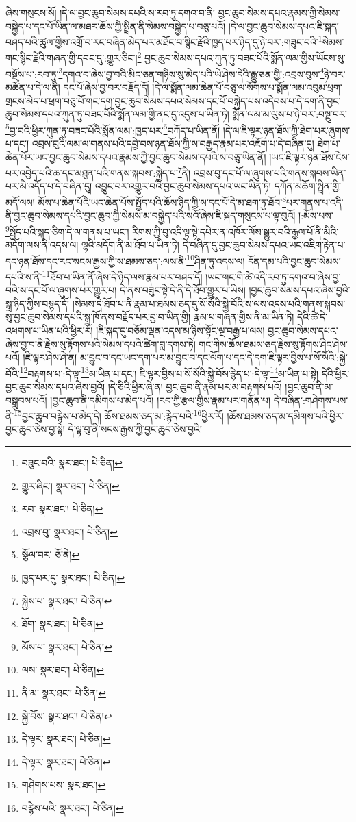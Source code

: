 ཞེས་གསུངས་སོ། །དེ་ལ་བྱང་ཆུབ་སེམས་དཔའི་ས་རབ་ཏུ་དགའ་བ་ནི། བྱང་ཆུབ་སེམས་དཔའ་རྣམས་ཀྱི་སེམས་བསྐྱེད་པ་དང་པོ་ཡིན་ལ་མཐར་ཆོས་ཀྱི་སྤྲིན་ནི་སེམས་བསྐྱེད་པ་བཅུ་པའོ། །དེ་ལ་བྱང་ཆུབ་སེམས་དཔའ་ཇི་སྐད་བཤད་པའི་ཚུལ་གྱིས་འགྲོ་བ་རང་བཞིན་མེད་པར་མཐོང་བ་སྙིང་རྗེའི་ཁྱད་པར་ཉིད་དུ་ཉེ་བར་:གཟུང་བའི་\footnote{བཟུང་བའི་  སྣར་ཐང་།  པེ་ཅིན། }སེམས་གང་སྙིང་རྗེའི་གཞན་གྱི་དབང་དུ་:གྱུར་ཅིང་།\footnote{གྱུར་ཞིང་།  སྣར་ཐང་།  པེ་ཅིན། } བྱང་ཆུབ་སེམས་དཔའ་ཀུན་ཏུ་བཟང་པོའི་སྨོན་ལམ་གྱིས་ཡོངས་སུ་བསྔོས་པ་:རབ་ཏུ་\footnote{རབ་  སྣར་ཐང་།  པེ་ཅིན། }དགའ་བ་ཞེས་བྱ་བའི་མིང་ཅན་གཉིས་སུ་མེད་པའི་ཡེ་ཤེས་དེའི་རྒྱུ་ཅན་གྱི་:འབྲས་བུས་\footnote{འབྲས་བུ་  སྣར་ཐང་།  པེ་ཅིན། }ཉེ་བར་མཚོན་པ་དེ་ལ་ནི། དང་པོ་ཞེས་བྱ་བར་བརྗོད་དོ། །དེ་ལ་སྨོན་ལམ་ཆེན་པོ་བཅུ་ལ་སོགས་པ་སྨོན་ལམ་འབུམ་ཕྲག་གྲངས་མེད་པ་ཕྲག་བཅུ་པོ་གང་དག་བྱང་ཆུབ་སེམས་དཔའ་སེམས་དང་པོ་བསྐྱེད་པས་འདེབས་པ་དེ་དག་ནི་བྱང་ཆུབ་སེམས་དཔའ་ཀུན་ཏུ་བཟང་པོའི་སྨོན་ལམ་གྱི་ནང་དུ་འདུས་པ་ཡིན་ཏེ། སྨོན་ལམ་མ་ལུས་པ་ཉེ་བར་:བསྡུ་བར་\footnote{སྩོལ་བར་  ཅོ་ནེ། }བྱ་བའི་ཕྱིར་ཀུན་ཏུ་བཟང་པོའི་སྨོན་ལམ་:ཁྱད་པར་\footnote{ཁྱད་པར་དུ་  སྣར་ཐང་།  པེ་ཅིན། }བཀོད་པ་ཡིན་ནོ། །དེ་ལ་ཇི་ལྟར་ཉན་ཐོས་ཀྱི་ཐེག་པར་ཞུགས་པ་དང་། འབྲས་བུའི་ལམ་ལ་གནས་པའི་དབྱེ་བས་ཉན་ཐོས་ཀྱི་ས་བརྒྱད་རྣམ་པར་འཇོག་པ་དེ་བཞིན་དུ། ཐེག་པ་ཆེན་པོར་ཡང་བྱང་ཆུབ་སེམས་དཔའ་རྣམས་ཀྱི་བྱང་ཆུབ་སེམས་དཔའི་ས་བཅུ་ཡིན་ནོ། །ཡང་ཇི་ལྟར་ཉན་ཐོས་ངེས་པར་འབྱེད་པའི་ཆ་དང་མཐུན་པའི་གནས་སྐབས་:སྐྱེད་པ་\footnote{སྐྱེས་པ་  སྣར་ཐང་།  པེ་ཅིན། }ནི། འབྲས་བུ་དང་པོ་ལ་ཞུགས་པའི་གནས་སྐབས་ཡིན་པར་མི་འདོད་པ་དེ་བཞིན་དུ། འབྱུང་བར་འགྱུར་བའི་བྱང་ཆུབ་སེམས་དཔའ་ཡང་ཡིན་ཏེ། དཀོན་མཆོག་སྤྲིན་གྱི་མདོ་ལས། མོས་པ་ཆེན་པོའི་ཡང་ཆེན་པོས་སྤྱོད་པའི་ཆོས་ཉིད་ཀྱི་ས་དང་པོ་དེ་མ་ཐག་ཏུ་ཐོབ་\footnote{ཐོག་  སྣར་ཐང་།  པེ་ཅིན། }པར་གནས་པ་འདི་ནི་བྱང་ཆུབ་སེམས་དཔའི་བྱང་ཆུབ་ཀྱི་སེམས་མ་བསྐྱེད་པའི་སའོ་ཞེས་ཇི་སྐད་གསུངས་པ་ལྟ་བུའོ། །:མོས་པས་\footnote{མོས་པ་  སྣར་ཐང་།  པེ་ཅིན། }སྤྱོད་པའི་སྐད་ཅིག་དེ་ལ་གནས་པ་ཡང་། རིགས་ཀྱི་བུ་འདི་ལྟ་སྟེ་དཔེར་ན་འཁོར་ལོས་སྒྱུར་བའི་རྒྱལ་པོ་ནི་མིའི་མདོག་ལས་ནི་འདས་ལ། ལྷའི་མདོག་ནི་མ་ཐོབ་པ་ཡིན་ཏེ། དེ་བཞིན་དུ་བྱང་ཆུབ་སེམས་དཔའ་ཡང་འཇིག་རྟེན་པ་དང་ཉན་ཐོས་དང་རང་སངས་རྒྱས་ཀྱི་ས་ཐམས་ཅད་:ལས་ནི་\footnote{ལས་  སྣར་ཐང་།  པེ་ཅིན། }ཤིན་ཏུ་འདས་ལ། དོན་དམ་པའི་བྱང་ཆུབ་སེམས་དཔའི་ས་ནི་\footnote{ནི་མ་  སྣར་ཐང་།  པེ་ཅིན། }ཐོབ་པ་ཡིན་ནོ་ཞེས་དེ་ཉིད་ལས་རྣམ་པར་བཤད་དོ། །ཡང་གང་གི་ཚེ་འདི་རབ་ཏུ་དགའ་བ་ཞེས་བྱ་བའི་ས་དང་པོ་ལ་ཞུགས་པར་གྱུར་པ། དེ་ནས་བཟུང་སྟེ་དེ་ནི་དེ་ཐོབ་གྱུར་པ་ཡིས། །བྱང་ཆུབ་སེམས་དཔའ་ཞེས་བྱའི་སྒྲ་ཉིད་ཀྱིས་བསྙད་དོ། །སེམས་དེ་ཐོབ་པ་ནི་རྣམ་པ་ཐམས་ཅད་དུ་སོ་སོའི་སྐྱེ་བོའི་ས་ལས་འདས་པའི་གནས་སྐབས་སུ་བྱང་ཆུབ་སེམས་དཔའི་སྒྲ་ཁོ་ནས་བརྗོད་པར་བྱ་བ་ཡིན་གྱི། རྣམ་པ་གཞན་གྱིས་ནི་མ་ཡིན་ཏེ། དེའི་ཚེ་དེ་འཕགས་པ་ཡིན་པའི་ཕྱིར་རོ། །ཇི་སྐད་དུ་བཅོམ་ལྡན་འདས་མ་ཉིས་སྟོང་ལྔ་བརྒྱ་པ་ལས། བྱང་ཆུབ་སེམས་དཔའ་ཞེས་བྱ་བ་ནི་རྗེས་སུ་རྟོགས་པའི་སེམས་དཔའི་ཚིག་བླ་དགས་ཏེ། གང་གིས་ཆོས་ཐམས་ཅད་རྗེས་སུ་རྟོགས་ཤིང་ཤེས་པའོ། །ཇི་ལྟར་ཤེས་ཤེ་ན། མ་བྱུང་བ་དང་ཡང་དག་པར་མ་བྱུང་བ་དང་ལོག་པ་དང་དེ་དག་ཇི་ལྟར་བྱིས་པ་སོ་སོའི་:སྐྱེ་བོའི་\footnote{སྐྱེ་བོས་  སྣར་ཐང་།  པེ་ཅིན། }བརྟགས་པ་:དེ་ལྟ་\footnote{དེ་ལྟར་  སྣར་ཐང་།  པེ་ཅིན། }མ་ཡིན་པ་དང་། ཇི་ལྟར་བྱིས་པ་སོ་སོའི་སྐྱེ་བོས་རྙེད་པ་:དེ་ལྟ་\footnote{དེ་ལྟར་  སྣར་ཐང་།  པེ་ཅིན། }མ་ཡིན་པ་སྟེ། དེའི་ཕྱིར་བྱང་ཆུབ་སེམས་དཔའ་ཞེས་བྱའོ། །དེ་ཅིའི་ཕྱིར་ཞེ་ན། བྱང་ཆུབ་ནི་རྣམ་པར་མ་བརྟགས་པའོ། །བྱང་ཆུབ་ནི་མ་བསྒྲུབས་པའོ། །བྱང་ཆུབ་ནི་དམིགས་པ་མེད་པའོ། །རབ་ཀྱི་རྩལ་གྱིས་རྣམ་པར་གནོན་པ། དེ་བཞིན་:གཤེགས་པས་ནི་\footnote{གཤེགས་པས་  སྣར་ཐང་། }བྱང་ཆུབ་བརྙེས་པ་མེད་དེ། ཆོས་ཐམས་ཅད་མ་:རྙེད་པའི་\footnote{བརྙེས་པའི་  སྣར་ཐང་།  པེ་ཅིན། }ཕྱིར་རོ། །ཆོས་ཐམས་ཅད་མ་དམིགས་པའི་ཕྱིར་བྱང་ཆུབ་ཅེས་བྱ་སྟེ། དེ་ལྟ་བུ་ནི་སངས་རྒྱས་ཀྱི་བྱང་ཆུབ་ཅེས་བྱའི། 